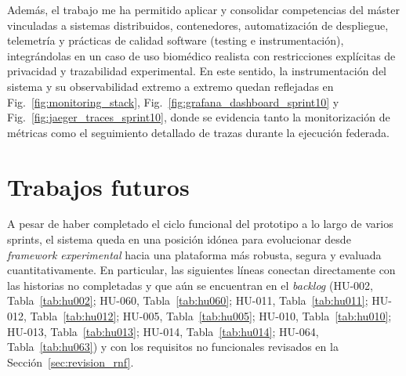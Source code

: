 \documentclass{report}
\begin{document}
Además, el trabajo me ha permitido aplicar y consolidar competencias del máster vinculadas a sistemas distribuidos, contenedores, automatización de despliegue, telemetría y prácticas de calidad software (testing e instrumentación), integrándolas en un caso de uso biomédico realista con restricciones explícitas de privacidad y trazabilidad experimental. En este sentido, la instrumentación del sistema y su observabilidad extremo a extremo quedan reflejadas en Fig.~\ref{fig:monitoring_stack}, Fig.~\ref{fig:grafana_dashboard_sprint10} y Fig.~\ref{fig:jaeger_traces_sprint10}, donde se evidencia tanto la monitorización de métricas como el seguimiento detallado de trazas durante la ejecución federada.



\section{Trabajos futuros}
\label{sec:trabajo_futuro}

A pesar de haber completado el ciclo funcional del prototipo a lo largo de varios sprints, el sistema queda en una posición idónea para evolucionar desde \textit{framework experimental} hacia una plataforma más robusta, segura y evaluada cuantitativamente. En particular, las siguientes líneas conectan directamente con las historias no completadas y que aún se encuentran en el \textit{backlog} (HU-002, Tabla~\ref{tab:hu002}; HU-060, Tabla~\ref{tab:hu060}; HU-011, Tabla~\ref{tab:hu011}; HU-012, Tabla~\ref{tab:hu012}; HU-005, Tabla~\ref{tab:hu005}; HU-010, Tabla~\ref{tab:hu010}; HU-013, Tabla~\ref{tab:hu013}; HU-014, Tabla~\ref{tab:hu014}; HU-064, Tabla~\ref{tab:hu063}) y con los requisitos no funcionales revisados en la Sección~\ref{sec:revision_rnf}.
\end{document}
